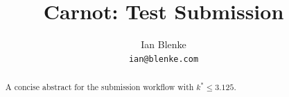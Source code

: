 \title{Carnot: Test Submission}
\author{Ian Blenke \\ \texttt{ian@blenke.com}}
\begin{abstract}
A concise abstract for the submission workflow with $k^* \leq 3.125$.
\end{abstract}